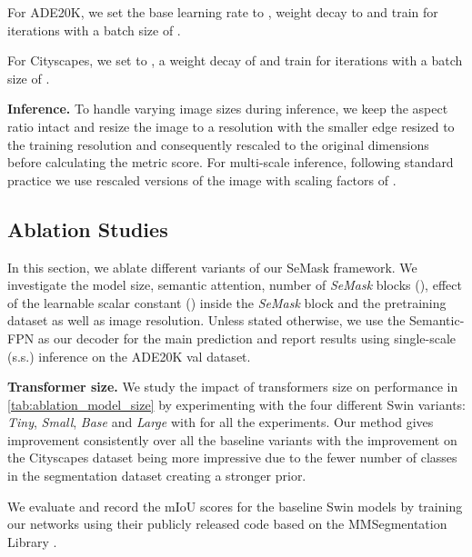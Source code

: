 \documentclass[10pt,twocolumn,letterpaper]{article}
\begin{document}
For ADE20K, we set the base learning rate  to , weight decay to  and train for  iterations with a batch size of .

For Cityscapes, we set  to , a weight decay of  and train for  iterations with a batch size of .

\noindent \textbf{Inference.} To handle varying image sizes during inference, we keep the aspect ratio intact and resize the image to a resolution with the smaller edge resized to the training resolution and consequently rescaled to the original dimensions before calculating the metric score. For multi-scale inference, following standard practice \cite{deeplabv3+} we use rescaled versions of the image with scaling factors of .

\subsection{Ablation Studies}

In this section, we ablate different variants of our SeMask framework. We investigate the model size, semantic attention, number of \textit{SeMask} blocks (), effect of the learnable scalar constant () inside the \textit{SeMask} block and the pretraining dataset as well as image resolution. Unless stated otherwise, we use the Semantic-FPN \cite{sem-fpn} as our decoder for the main prediction and report results using single-scale (s.s.) inference on the ADE20K \cite{ade20k} val dataset.

\noindent
\textbf{Transformer size.} We study the impact of transformers size on performance in \cref{tab:ablation_model_size} by experimenting with the four different Swin variants: \textit{Tiny}, \textit{Small}, \textit{Base} and \textit{Large} with  for all the experiments. 
Our method gives improvement consistently over all the baseline variants with the improvement on the Cityscapes dataset being more impressive due to the fewer number of classes in the segmentation dataset creating a stronger prior.

We evaluate and record the mIoU scores for the baseline Swin models by training our networks using their publicly released code based on the MMSegmentation Library \cite{mmseg}.
\end{document}
